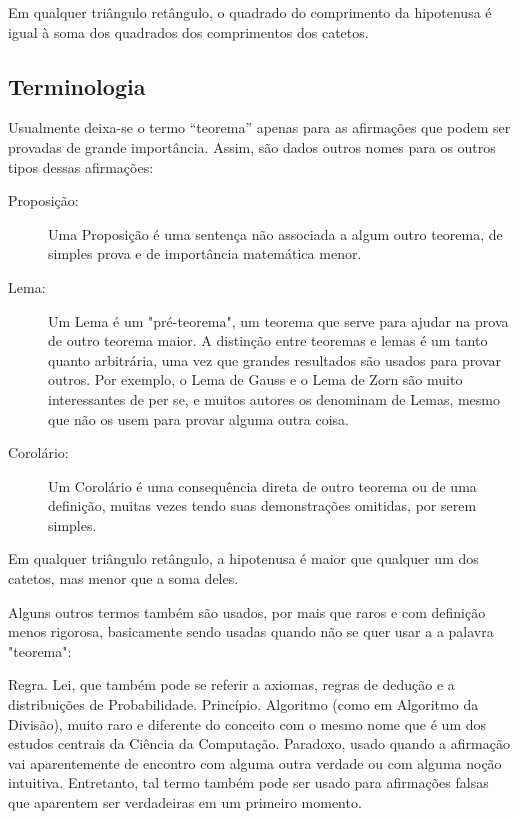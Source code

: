\documentclass[
	article,			%
	12pt,				%
	twoside,			%
	a4paper,			%
	english,			%
	brazil,				%
	sumario=tradicional
	]{abntex2-modelo-notas-de-aula}
\begin{document}
\begin{teorema}
	Em qualquer triângulo retângulo, o quadrado do comprimento da hipotenusa é igual à soma dos quadrados dos comprimentos dos catetos. 
\end{teorema}


\subsection{Terminologia}



Usualmente deixa-se o termo ``teorema'' apenas para as afirmações que podem ser provadas de grande importância. Assim, são dados outros nomes para os outros tipos dessas afirmações:

\begin{description}
	\item[Proposição:] Uma Proposição é uma sentença não associada a algum outro teorema, de simples prova e de importância matemática menor.
	\item[Lema:] Um Lema é um "pré-teorema", um teorema que serve para ajudar na prova de outro teorema maior. A distinção entre teoremas e lemas é um tanto quanto arbitrária, uma vez que grandes resultados são usados para provar outros. Por exemplo, o Lema de Gauss e o Lema de Zorn são muito interessantes de per se, e muitos autores os denominam de Lemas, mesmo que não os usem para provar alguma outra coisa.
	\item[Corolário:] Um Corolário é uma consequência direta de outro teorema ou de uma definição, muitas vezes tendo suas demonstrações omitidas, por serem simples.
\end{description}


\begin{corolario}
	Em qualquer triângulo retângulo, a hipotenusa é maior que qualquer um dos catetos, mas menor que a soma deles.
\end{corolario}

Alguns outros termos também são usados, por mais que raros e com definição menos rigorosa, basicamente sendo usadas quando não se quer usar a a palavra "teorema":

Regra.
Lei, que também pode se referir a axiomas, regras de dedução e a distribuições de Probabilidade.
Princípio.
Algoritmo (como em Algoritmo da Divisão), muito raro e diferente do conceito com o mesmo nome que é um dos estudos centrais da Ciência da Computação.
Paradoxo, usado quando a afirmação vai aparentemente de encontro com alguma outra verdade ou com alguma noção intuitiva. Entretanto, tal termo também pode ser usado para afirmações falsas que aparentem ser verdadeiras em um primeiro momento.
\end{document}
